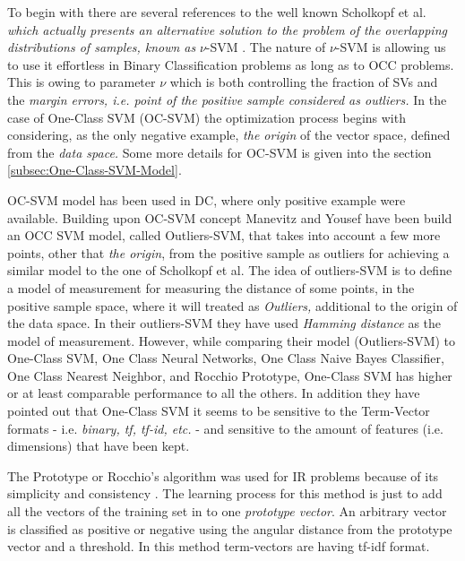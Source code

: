 To begin with there are several references to the well known Scholkopf et al.\cite{scholkopf1999estimating} \textit{which actually presents an alternative solution to the problem of the overlapping distributions of samples, known as }$\nu$-SVM \cite{bishop2006}. The nature of $\nu$-SVM is allowing us to use it effortless in Binary Classification problems as long as to OCC problems. This is owing to parameter $\nu$ which is both controlling the fraction of SVs and the \textit{margin errors, i.e. point of the positive sample considered as outliers. }In the case of One-Class SVM (OC-SVM) the optimization process begins with considering, as the only negative example, \textit{the origin }of the vector space\textit{, }defined from the \textit{data space. }Some more details for OC-SVM is given into the section \ref{subsec:One-Class-SVM-Model}.

OC-SVM model has been used in DC, where only positive example were available. Building upon OC-SVM concept Manevitz and Yousef \cite{manevitz2002one,khan2010survey}have been build an OCC SVM model, called Outliers-SVM, that takes into account a few more points, other that \textit{the origin}, from the positive sample as outliers for achieving a similar model to the one of Scholkopf et al. The idea of outliers-SVM is to define a model of measurement for measuring the distance of some points, in the positive sample space, where it will treated as \textit{Outliers,} additional to the origin of the data space. In their outliers-SVM they have used \textit{Hamming distance} as the model of measurement. However, while comparing their model (Outliers-SVM) to One-Class SVM, One Class Neural Networks, One Class Naive Bayes Classifier, One Class Nearest Neighbor, and Rocchio Prototype, One-Class SVM has higher or at least comparable performance to all the others. In addition they have pointed out that One-Class SVM it seems to be sensitive to the Term-Vector formats - i.e. \textit{binary, tf, tf-id, etc.} - and sensitive to the amount of features (i.e. dimensions) that have been kept.

The Prototype or Rocchio's algorithm was used for IR problems because of its simplicity and consistency \cite{joachims1997probabilistic}. The learning process for this method is just to add all the vectors of the training set in to one \textit{prototype vector}. An arbitrary vector is classified as positive or negative using the angular distance from the prototype vector and a threshold. In this method term-vectors are having tf-idf format. 

